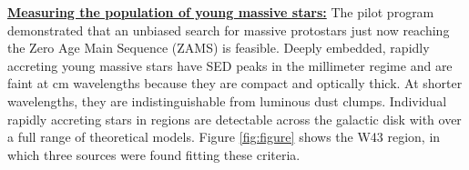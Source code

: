 \documentclass[11pt,preprint]{aastex_nofoot}
\begin{document}
% 
% 




\underline{\textbf{\helv Measuring the population of young massive stars:}}
The pilot program demonstrated that an unbiased search for massive protostars
just now reaching the Zero Age Main Sequence (ZAMS) is feasible.  Deeply
embedded, rapidly accreting young massive stars have
SED peaks in the millimeter regime and are faint at cm wavelengths because they
are compact and optically thick.  At shorter wavelengths, they are
indistinguishable from luminous dust clumps.  Individual rapidly accreting
stars in \hchii regions are  detectable across the galactic disk with
\MUSTANG over a full range of theoretical models.  Figure \ref{fig:figure}
shows the W43 region, in which three sources were found fitting these criteria.
\end{document}
